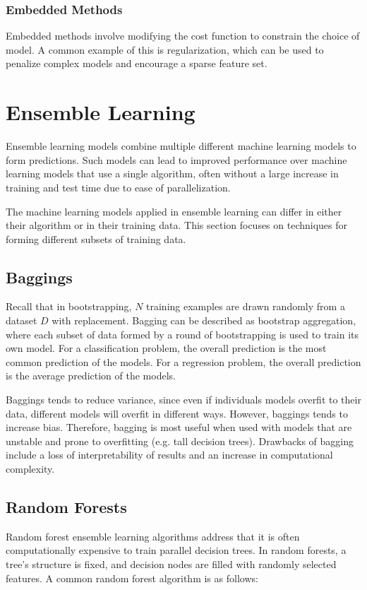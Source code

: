 \documentclass[12pt,titlepage]{article}
\let\stdsection\section
\renewcommand\section{\clearpage\stdsection}
\begin{document}
      \subsubsection{Embedded Methods}
        Embedded methods involve  modifying the cost function to constrain the choice of model. A common example of this is regularization, which can
        be used to penalize complex models and encourage a sparse feature set.

  \section{Ensemble Learning}
    Ensemble learning models combine multiple different machine learning models to form predictions. Such models can lead to improved performance over
    machine learning models that use a single algorithm, often without a large increase in training and test time due to ease of parallelization.

    The machine learning models applied in ensemble learning can differ in either their algorithm or in their training data. This section focuses on
    techniques for forming different subsets of training data.

    \subsection{Baggings}
      Recall that in bootstrapping, $N$ training examples are drawn randomly from a dataset $D$ with replacement. Bagging can be described as bootstrap
      aggregation, where each subset of data formed by a round of bootstrapping is used to train its own model. For a classification problem, the
      overall prediction is the most common prediction of the models. For a regression problem, the overall prediction is the average prediction of the
      models.

      Baggings tends to reduce variance, since even if individuals models overfit to their data, different models will overfit in different ways. However,
      baggings tends to increase bias. Therefore, bagging is most useful when used with models that are unstable and prone to overfitting (e.g. tall decision
      trees). Drawbacks of bagging include a loss of interpretability of results and an increase in computational complexity.

    \subsection{Random Forests}
      Random forest ensemble learning algorithms address that it is often computationally expensive to train parallel decision trees. In random forests,
      a tree's structure is fixed, and decision nodes are filled with randomly selected features. A common random forest algorithm is as follows:
\end{document}
